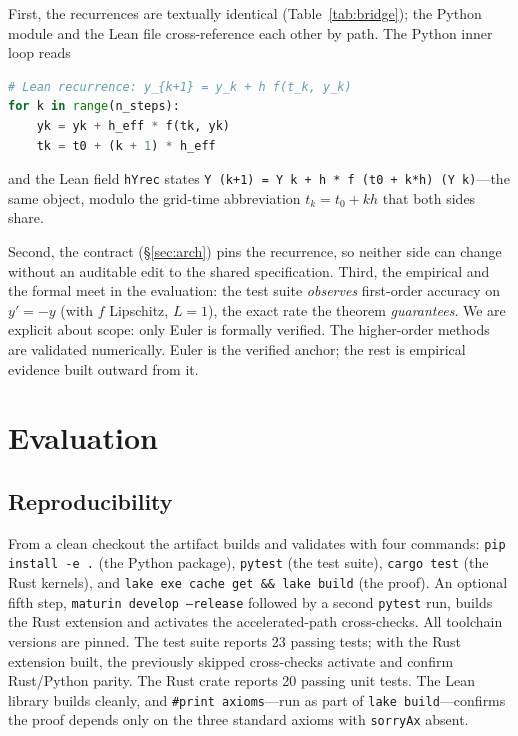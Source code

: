 \documentclass[sigplan,nonacm,screen]{acmart}
\begin{document}
First, the recurrences are textually identical (Table~\ref{tab:bridge}); the
Python module and the Lean file cross-reference each other by path. The Python
inner loop reads
\begin{lstlisting}[language=Python]
# Lean recurrence: y_{k+1} = y_k + h f(t_k, y_k)
for k in range(n_steps):
    yk = yk + h_eff * f(tk, yk)
    tk = t0 + (k + 1) * h_eff
\end{lstlisting}
and the Lean field \texttt{hYrec} states
\lstinline[language=lean]|Y (k+1) = Y k + h * f (t0 + k*h) (Y k)|---the same
object, modulo the grid-time abbreviation $t_k = t_0 + kh$ that both sides share.

Second, the contract (\S\ref{sec:arch}) pins the recurrence, so neither side can
change without an auditable edit to the shared specification. Third, the empirical
and the formal meet in the evaluation: the test suite \emph{observes} first-order
accuracy on $y' = -y$ (with $f$ Lipschitz, $L=1$), the exact rate the theorem
\emph{guarantees}. We are explicit about scope: only Euler is formally verified.
The higher-order methods are validated numerically. Euler is the verified anchor;
the rest is empirical evidence built outward from it.

\section{Evaluation}
\label{sec:eval}

\subsection{Reproducibility}
From a clean checkout the artifact builds and validates with four commands:
\texttt{pip install -e .} (the Python package), \texttt{pytest} (the test suite),
\texttt{cargo test} (the Rust kernels), and
\texttt{lake exe cache get \&\& lake build} (the proof). An optional fifth step,
\texttt{maturin develop --release} followed by a second \texttt{pytest} run,
builds the Rust extension and activates the accelerated-path cross-checks. All
toolchain versions are pinned. The test suite reports 23 passing tests; with the
Rust extension built, the previously skipped cross-checks activate and confirm
Rust/Python parity. The Rust crate reports 20 passing unit tests. The Lean
library builds cleanly, and \texttt{\#print axioms}---run as part of
\texttt{lake build}---confirms the proof depends only on the three standard
axioms with \texttt{sorryAx} absent.
\end{document}
